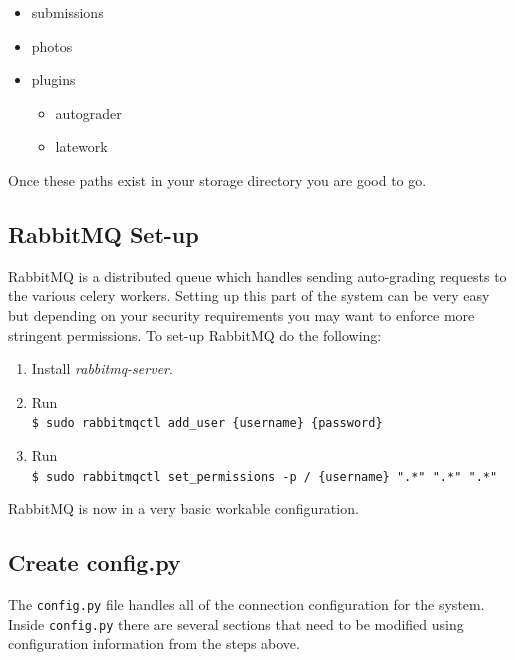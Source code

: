 \documentclass[11pt]{report}
\begin{document}
\begin{itemize}
	\item submissions
	\item photos
	\item plugins
	\begin{itemize}
		\item autograder
		\item latework
	\end{itemize}
\end{itemize}

Once these paths exist in your storage directory you are good to go.

\subsection{RabbitMQ Set-up}

RabbitMQ is a distributed queue which handles sending auto-grading requests to the various celery workers.
Setting up this part of the system can be very easy but depending on your security requirements you may want
to enforce more stringent permissions. To set-up RabbitMQ do the following:

\begin{enumerate}
\item Install \emph{rabbitmq-server}.
\item Run\\ \verb|$ sudo rabbitmqctl add_user {username} {password}|
\item Run\\ \verb|$ sudo rabbitmqctl set_permissions -p / {username} ".*" ".*" ".*"|
\end{enumerate}

RabbitMQ is now in a very basic workable configuration.

\subsection{Create config.py}
\label{sec:config}
The \texttt{config.py} file handles all of the connection configuration for the system.
Inside \texttt{config.py} there are several sections that need to be modified using configuration
information from the steps above.
\end{document}
